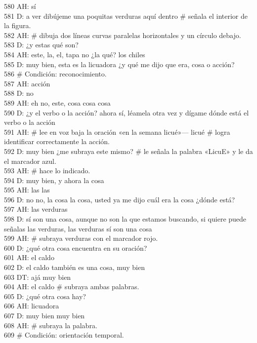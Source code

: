 580 AH: sí\\
581 D: a ver dibújeme una poquitas verduras aquí dentro \# señala el interior de la figura.\\
582 AH: \# dibuja dos líneas curvas paralelas horizontales y un círculo debajo.\\
583 D: ¿y estas qué son?\\
584 AH: este, la, el, tapa no ¿la qué? los chiles\\
585 D: muy bien, esta es la licuadora ¿y qué me dijo que era, cosa o acción?\\
586 \# Condición: reconocimiento.\\
587 AH: acción\\
588 D: no\\
589 AH: eh no, este, cosa cosa cosa\\
590 D: ¿y el verbo o la acción? ahora sí, léamela otra vez y dígame dónde está el verbo o la acción\\
591 AH: \# lee en voz baja la oración «en la semana licué»--- licué \# logra identificar correctamente la acción.\\
592 D: muy bien ¿me subraya este mismo? \# le señala la palabra «LicuE» y le da el marcador azul.\\
593 AH: \# hace lo indicado.\\
594 D: muy bien, y ahora la cosa\\
595 AH: las las\\
596 D: no no, la cosa la cosa, usted ya me dijo cuál era la cosa ¿dónde está?\\
597 AH: las verduras\\
598 D: sí son una cosa, aunque no son la que estamos buscando, si quiere puede señalas las verduras, las verduras sí son una cosa\\
599 AH: \# subraya verduras con el marcador rojo.\\
600 D: ¿qué otra cosa encuentra en su oración?\\
601 AH: el caldo\\
602 D: el caldo también es una cosa, muy bien\\
603 DT: ajá muy bien\\
604 AH: el caldo \# subraya ambas palabras.\\
605 D: ¿qué otra cosa hay?\\
606 AH: licuadora\\
607 D: muy bien muy bien\\
608 AH: \# subraya la palabra.\\
609 \# Condición: orientación temporal.\\
